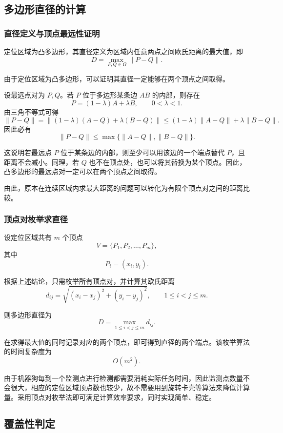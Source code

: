 \documentclass[withoutpreface,bwprint]{cumcmthesis}
\begin{document}
\subsection{多边形直径的计算}

\subsubsection{直径定义与顶点最远性证明}

定位区域为凸多边形，其直径定义为区域内任意两点之间欧氏距离的最大值，即
\[
D=\max_{P,Q\in \Omega}\|P-Q\|.
\]

由于定位区域为凸多边形，可以证明其直径一定能够在两个顶点之间取得。

设最远点对为 $P,Q$。若 $P$ 位于多边形某条边 $AB$ 的内部，则存在
\[
P=(1-\lambda)A+\lambda B,\qquad 0<\lambda<1.
\]
由三角不等式可得
\[
\|P-Q\|
=
\|(1-\lambda)(A-Q)+\lambda(B-Q)\|
\leq
(1-\lambda)\|A-Q\|+\lambda\|B-Q\|.
\]
因此必有
\[
\|P-Q\|
\leq
\max\{\|A-Q\|,\|B-Q\|\}.
\]

这说明若最远点 $P$ 位于某条边的内部，则至少可以用该边的一个端点替代 $P$，且距离不会减小。同理，若 $Q$ 也不在顶点处，也可以将其替换为某个顶点。因此，凸多边形的最远点对一定可以在两个顶点之间取得。

由此，原本在连续区域内求最大距离的问题可以转化为有限个顶点对之间的距离比较。

\subsubsection{顶点对枚举求直径}

设定位区域共有 $m$ 个顶点
\[
V=\{P_1,P_2,\ldots,P_m\},
\]
其中
\[
P_i=(x_i,y_i).
\]

根据上述结论，只需枚举所有顶点对，并计算其欧氏距离
\[
d_{ij}
=
\sqrt{(x_i-x_j)^2+(y_i-y_j)^2},
\qquad 1\leq i<j\leq m.
\]

则多边形直径为
\[
D=\max_{1\leq i<j\leq m} d_{ij}.
\]

在求得最大值的同时记录对应的两个顶点，即可得到直径的两个端点。该枚举算法的时间复杂度为
\[
O(m^2).
\]

由于机器狗每到一个监测点进行检测都需要消耗实际任务时间，因此监测点数量不会很大，相应的定位区域顶点数也较少，故不需要用到旋转卡壳等算法来降低计算量。采用顶点对枚举法即可满足计算效率要求，同时实现简单、稳定。

\subsection{覆盖性判定}
\end{document}
